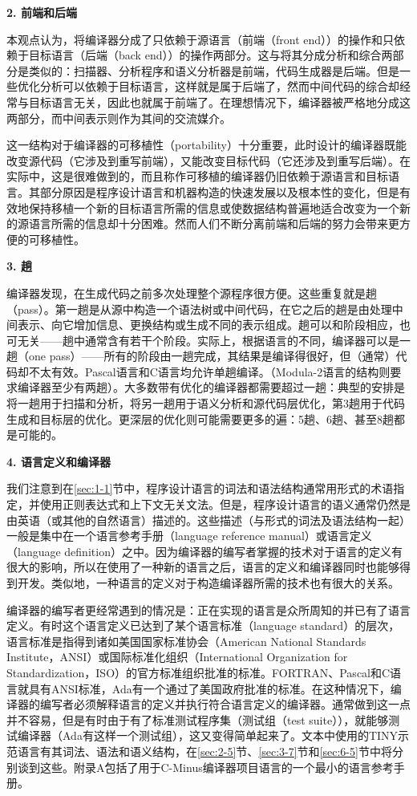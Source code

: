\documentclass[lang=cn,10pt]{elegantbook}
\begin{document}
\textbf{2. 前端和后端}

本观点认为，将编译器分成了只依赖于源语言（前端（front end））的操作和只依赖于目标语言（后端（back end））的操作两部分。这与将其分成分析和综合两部分是类似的：扫描器、分析程序和语义分析器是前端，代码生成器是后端。但是一些优化分析可以依赖于目标语言，这样就是属于后端了，然而中间代码的综合却经常与目标语言无关，因此也就属于前端了。在理想情况下，编译器被严格地分成这两部分，而中间表示则作为其间的交流媒介。

这一结构对于编译器的可移植性（portability）十分重要，此时设计的编译器既能改变源代码（它涉及到重写前端），又能改变目标代码（它还涉及到重写后端）。在实际中，这是很难做到的，而且称作可移植的编译器仍旧依赖于源语言和目标语言。其部分原因是程序设计语言和机器构造的快速发展以及根本性的变化，但是有效地保持移植一个新的目标语言所需的信息或使数据结构普遍地适合改变为一个新的源语言所需的信息却十分困难。然而人们不断分离前端和后端的努力会带来更方便的可移植性。

\textbf{3. 趟}

编译器发现，在生成代码之前多次处理整个源程序很方便。这些重复就是趟（pass）。第一趟是从源中构造一个语法树或中间代码，在它之后的趟是由处理中间表示、向它增加信息、更换结构或生成不同的表示组成。趟可以和阶段相应，也可无关——趟中通常含有若干个阶段。实际上，根据语言的不同，编译器可以是一趟（one pass）——所有的阶段由一趟完成，其结果是编译得很好，但（通常）代码却不太有效。Pascal语言和C语言均允许单趟编译。（Modula-2语言的结构则要求编译器至少有两趟）。大多数带有优化的编译器都需要超过一趟：典型的安排是将一趟用于扫描和分析，将另一趟用于语义分析和源代码层优化，第3趟用于代码生成和目标层的优化。更深层的优化则可能需要更多的遍：5趟、6趟、甚至8趟都是可能的。

\textbf{4. 语言定义和编译器}

我们注意到在\ref{sec:1-1}节中，程序设计语言的词法和语法结构通常用形式的术语指定，并使用正则表达式和上下文无关文法。但是，程序设计语言的语义通常仍然是由英语（或其他的自然语言）描述的。这些描述（与形式的词法及语法结构一起）一般是集中在一个语言参考手册（language reference manual）或语言定义（language definition）之中。因为编译器的编写者掌握的技术对于语言的定义有很大的影响，所以在使用了一种新的语言之后，语言的定义和编译器同时也能够得到开发。类似地，一种语言的定义对于构造编译器所需的技术也有很大的关系。

编译器的编写者更经常遇到的情况是：正在实现的语言是众所周知的并已有了语言定义。有时这个语言定义已达到了某个语言标准（language standard）的层次，语言标准是指得到诸如美国国家标准协会（American National Standards Institute，ANSI）或国际标准化组织（International Organization for Standardization，ISO）的官方标准组织批准的标准。FORTRAN、Pascal和C语言就具有ANSI标准，Ada有一个通过了美国政府批准的标准。在这种情况下，编译器的编写者必须解释语言的定义并执行符合语言定义的编译器。通常做到这一点并不容易，但是有时由于有了标准测试程序集（测试组（test suite）），就能够测试编译器（Ada有这样一个测试组），这又变得简单起来了。文本中使用的TINY示范语言有其词法、语法和语义结构，在\ref{sec:2-5}节、\ref{sec:3-7}节和\ref{sec:6-5}节中将分别谈到这些。附录A包括了用于C-Minus编译器项目语言的一个最小的语言参考手册。
\end{document}

